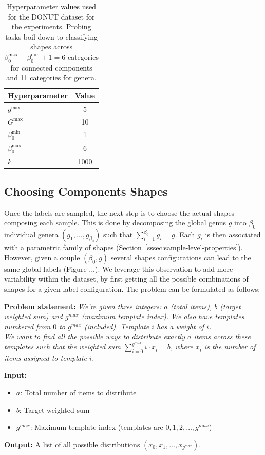 \begin{table}
\centering
\label{tab:topogen-hyperparams}
\begin{tabular}{l c}
\toprule
\textbf{Hyperparameter} & \textbf{Value} \\
\midrule
$g^{\max}$ & 5 \\
$G^{\max}$ & 10 \\
$\beta_0^{\min}$ & 1 \\
$\beta_0^{\max}$ & 6 \\
$k$ & 1000 \\
\bottomrule
\end{tabular}
\caption{Hyperparameter values used for the DONUT dataset for the experiments. Probing tasks boil down to classifying shapes across $\beta_0^{\max} - \beta_0^{\min} + 1 = 6$ categories for connected components and 11 categories for genera.}
\end{table}

\subsection{Choosing Components Shapes}
\label{ssec:suppl_choosing_components}

Once the labels are sampled, the next step is to choose the actual shapes composing each sample. This is done by decomposing the global genus $g$ into $\beta_0$ individual genera $(g_1, \dots, g_{\beta_0})$ such that $\sum_{i=1}^{\beta_0} g_i = g$. Each $g_i$ is then associated with a parametric family of shapes (Section~\ref{sssec:sample-level-properties}). However, given a couple $(\beta_0, g)$ several shapes configurations can lead to the same global labels (Figure ...). We leverage this observation to add more variability within the dataset, by first getting all the possible combinations of shapes for a given label configuration. The problem can be formulated as follows:

\begin{tcolorbox}[mybox]
  \textbf{Problem statement:} \emph{We're given three integers: $a$ (total items), $b$ (target weighted sum) and $g^{max}$ (maximum template index). We also have templates numbered from $0$ to $g^{max}$ (included). Template $i$ has a weight of $i$. \\ We want to find all the possible ways to distribute exactly $a$ items across these templates such that the weighted sum $\sum_{i=0}^{g^{max}} i \cdot x_i = b$, where $x_i$ is the number of items assigned to template $i$.} 

  \textbf{Input:}
  \begin{itemize}
    \item $a$: Total number of items to distribute
    \item $b$: Target weighted sum
    \item $g^{max}$: Maximum template index (templates are $0, 1, 2, \dots, g^{max}$)
  \end{itemize}

  \textbf{Output:} A list of all possible distributions $(x_0, x_1, \dots, x_{g^{max}})$.
\end{tcolorbox}

